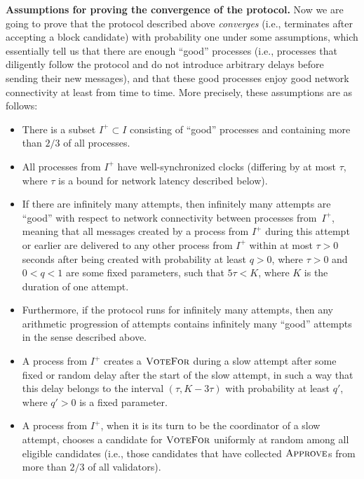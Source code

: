 \documentclass[12pt,oneside]{article}
\def\makepoint#1{\medbreak\noindent{\bf #1.\ }}
\def\nxsubpoint{\refstepcounter{subsubsection}%
  \smallbreak\makepoint{\thesubsubsection}}
\def\emb#1{\textbf{#1.}}
\def\opsc#1{\operatorname{\textsc{#1}}}
\def\Approve{\opsc{Approve}}
\def\VoteFor{\opsc{VoteFor}}
\begin{document}
\nxsubpoint\emb{Assumptions for proving the convergence of the protocol}\label{sp:conv.ass}
Now we are going to prove that the protocol described above {\em converges\/} (i.e., terminates after accepting a block candidate) with probability one under some assumptions, which essentially tell us that there are enough ``good'' processes (i.e., processes that diligently follow the protocol and do not introduce arbitrary delays before sending their new messages), and that these good processes enjoy good network connectivity at least from time to time. More precisely, these assumptions are as follows:
\begin{itemize}
\item There is a subset $I^+\subset I$ consisting of ``good'' processes and containing more than $2/3$ of all processes.
\item All processes from $I^+$ have well-synchronized clocks (differing by at most $\tau$, where $\tau$ is a bound for network latency described below).
\item If there are infinitely many attempts, then infinitely many attempts are ``good'' with respect to network connectivity between processes from~$I^+$, meaning that all messages created by a process from $I^+$ during this attempt or earlier are delivered to any other process from $I^+$ within at most $\tau>0$ seconds after being created with probability at least $q>0$, where $\tau>0$ and $0<q<1$ are some fixed parameters, such that $5\tau<K$, where $K$ is the duration of one attempt.
\item Furthermore, if the protocol runs for infinitely many attempts, then any arithmetic progression of attempts contains infinitely many ``good'' attempts in the sense described above.
\item A process from $I^+$ creates a $\VoteFor$ during a slow attempt after some fixed or random delay after the start of the slow attempt, in such a way that this delay belongs to the interval $(\tau,K-3\tau)$ with probability at least $q'$, where $q'>0$ is a fixed parameter.
\item A process from $I^+$, when it is its turn to be the coordinator of a slow attempt, chooses a candidate for $\VoteFor$ uniformly at random among all eligible candidates (i.e., those candidates that have collected $\Approve$s from more than $2/3$ of all validators).
\end{itemize}
\end{document}
